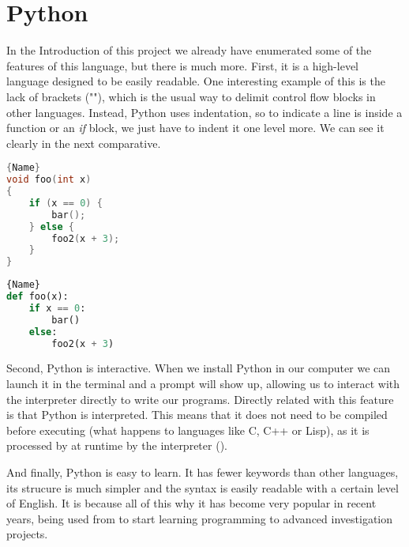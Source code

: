 \section{Python}
In the Introduction of this project we already have enumerated some of the features of this language, but there is much more. First, it is a high-level language designed to be easily readable. One interesting example of this is the lack of brackets ("{}"), which is the usual way to delimit control flow blocks in other languages. Instead, Python uses indentation, so to indicate a line is inside a function or an \textit{if} block, we just have to indent it one level more. We can see it clearly in the next comparative.

\noindent\begin{minipage}[t]{.45\textwidth}
\begin{lstlisting}[caption=C code,frame=tlrb, language=C]{Name}
void foo(int x)
{
    if (x == 0) {
        bar();
    } else {
        foo2(x + 3);
    }
}
\end{lstlisting}
\end{minipage}\hfill
\begin{minipage}[t]{.45\textwidth}
\begin{lstlisting}[caption=Python code,frame=tlrb, language=Python]{Name}
def foo(x):
    if x == 0:
        bar()
    else:
        foo2(x + 3)
\end{lstlisting}
\end{minipage}

Second, Python is interactive. When we install Python in our computer we can launch it in the terminal and a prompt will show up, allowing us to interact with the interpreter directly to write our programs. Directly related with this feature is that Python is interpreted. This means that it does not need to be compiled before executing (what happens to languages like C, C++ or Lisp), as it is processed by at runtime by the interpreter (\cite{python_overview}). 

And finally, Python is easy to learn. It has fewer keywords than other languages, its strucure is much simpler and the syntax is easily readable with a certain level of English. It is because all of this why it has become very popular in recent years, being used from to start learning programming to advanced investigation projects.

